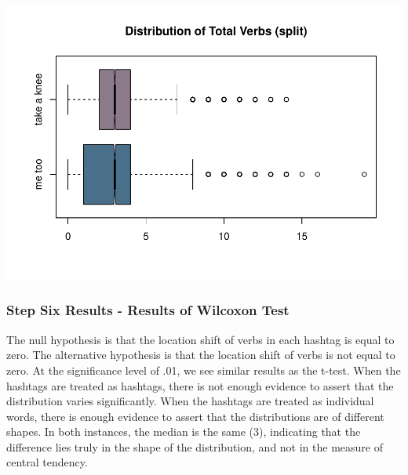 \documentclass[]{article}
\newenvironment{Shaded}{\begin{snugshade}}{\end{snugshade}}
\newcommand{\KeywordTok}[1]{\textcolor[rgb]{0.13,0.29,0.53}{\textbf{#1}}}
\newcommand{\DataTypeTok}[1]{\textcolor[rgb]{0.13,0.29,0.53}{#1}}
\newcommand{\StringTok}[1]{\textcolor[rgb]{0.31,0.60,0.02}{#1}}
\newcommand{\OtherTok}[1]{\textcolor[rgb]{0.56,0.35,0.01}{#1}}
\newcommand{\OperatorTok}[1]{\textcolor[rgb]{0.81,0.36,0.00}{\textbf{#1}}}
\newcommand{\NormalTok}[1]{#1}
\begin{document}
\begin{Shaded}
\end{Shaded}

\includegraphics{figure/total_verbs_notched_blox_plot-2.pdf}

\subsubsection{Step Six Results - Results of Wilcoxon
Test}\label{step-six-results---results-of-wilcoxon-test}

The null hypothesis is that the location shift of verbs in each hashtag
is equal to zero. The alternative hypothesis is that the location shift
of verbs is not equal to zero. At the significance level of .01, we see
similar results as the t-test. When the hashtags are treated as
hashtags, there is not enough evidence to assert that the distribution
varies significantly. When the hashtags are treated as individual words,
there is enough evidence to assert that the distributions are of
different shapes. In both instances, the median is the same (3),
indicating that the difference lies truly in the shape of the
distribution, and not in the measure of central tendency.
\end{document}
